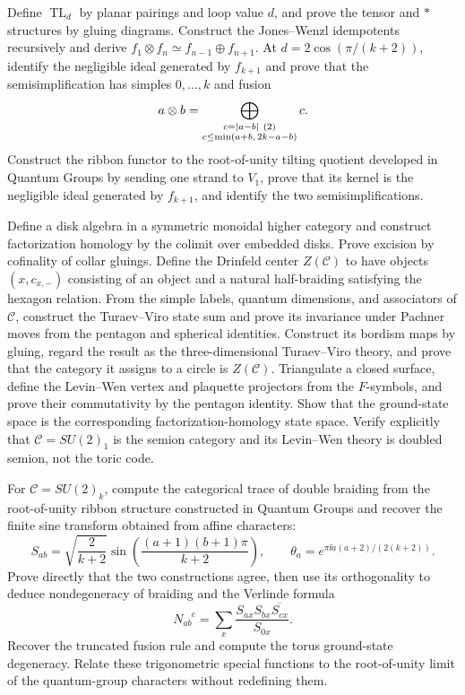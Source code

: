 \begin{exercise}
Define $\operatorname{TL}_d$ by planar pairings and loop value $d$, and prove
the tensor and $*$ structures by gluing diagrams.  Construct the Jones--Wenzl
idempotents recursively and derive
$f_1\otimes f_n\simeq f_{n-1}\oplus f_{n+1}$.  At
$d=2\cos(\pi/(k+2))$, identify the negligible ideal generated by $f_{k+1}$
and prove that the semisimplification has simples $0,\ldots,k$ and fusion
\[
 a\otimes b=\bigoplus_{\substack{c=\left\lvert a-b\right\rvert\ (2)\\
 c\le\min(a+b,\,2k-a-b)}}c.
\]
Construct the ribbon functor to the root-of-unity tilting quotient developed
in Quantum Groups by sending one strand to $V_1$, prove that its kernel is the
negligible ideal generated by $f_{k+1}$, and identify the two
semisimplifications.
\end{exercise}

\begin{exercise}
Define a disk algebra in a symmetric monoidal higher category and construct
factorization homology by the colimit over embedded disks.  Prove excision by
cofinality of collar gluings.  Define the Drinfeld center $Z(\mathcal C)$ to
have objects $(x,c_{x,-})$ consisting of an object and a natural half-braiding
satisfying the hexagon relation.  From the simple labels, quantum dimensions,
and associators of $\mathcal C$, construct the Turaev--Viro state sum and
prove its invariance under Pachner moves from the pentagon and spherical
identities.  Construct its bordism maps by gluing, regard the result as the
three-dimensional Turaev--Viro theory, and prove that the category it assigns
to a circle is $Z(\mathcal C)$.  Triangulate a closed surface,
define the Levin--Wen vertex and plaquette projectors from the $F$-symbols,
and prove their commutativity by the pentagon identity.  Show that the
ground-state space is the corresponding factorization-homology state space.
Verify explicitly that $\mathcal C=SU(2)_1$ is the semion category and its
Levin--Wen theory is doubled semion, not the toric code.
\end{exercise}

\begin{exercise}
For $\mathcal C=SU(2)_k$, compute the categorical trace of double braiding
from the root-of-unity ribbon structure constructed in Quantum Groups and
recover the finite sine transform
obtained from affine characters:
\[
 S_{ab}=\sqrt{\frac{2}{k+2}}
 \sin\!\left(\frac{(a+1)(b+1)\pi}{k+2}\right),
 \qquad
 \theta_a=e^{\pi\ii a(a+2)/(2(k+2))}.
\]
Prove directly that the two constructions agree, then use its orthogonality
to deduce nondegeneracy of braiding and the Verlinde formula
\[
 N_{ab}^{\phantom{ab}c}=\sum_x
 \frac{S_{ax}S_{bx}\overline{S_{cx}}}{S_{0x}}.
\]
Recover the truncated fusion rule and compute the torus ground-state
degeneracy.  Relate these trigonometric special functions to the root-of-unity
limit of the quantum-group characters without redefining them.
\end{exercise}

